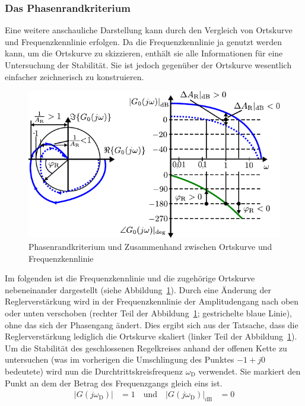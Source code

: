 \subsubsection{Das Phasenrandkriterium}
%
Eine weitere anschauliche Darstellung kann durch den Vergleich von Ortskurve und Frequenzkennlinie erfolgen. Da die Frequenzkennlinie ja genutzt werden kann, um die Ortskurve zu skizzieren, enthält sie alle Informationen für eine Untersuchung der Stabilität. Sie ist jedoch gegenüber der Ortskurve wesentlich einfacher zeichnerisch zu konstruieren. 
%
\begin{figure}[h!]
	\centering
	\includegraphics[width=.8\linewidth]{Abbildungen/Systemanalyse/PDF/Phasenrand.pdf}
	\caption{Phasenrandkriterium und Zusammenhand zwischen Ortskurve und Frequenzkennlinie}
	\label{fig:Phasenrand}
\end{figure}
%
Im folgenden ist die Frequenzkennlinie und die zugehörige Ortskurve nebeneinander dargestellt (siehe Abbildung~\ref{fig:Phasenrand}). Durch eine Änderung der Reglerverstärkung wird in der Frequenzkennlinie der Amplitudengang nach oben oder unten verschoben (rechter Teil der Abbildung~\ref{fig:Phasenrand}; gestrichelte blaue Linie), ohne das sich der Phasengang ändert. Dies ergibt sich aus der Tatsache, dass die Reglerverstärkung lediglich die Ortskurve skaliert (linker Teil der Abbildung~\ref{fig:Phasenrand}). Um die Stabilität des geschlossenen Regelkreises anhand der offenen Kette zu untersuchen (was im vorherigen die Umschlingung des Punktes $-1+j0$ bedeutete) wird nun die Durchtrittskreisfrequenz $\omega_{\text{D}}$ verwendet. Sie markiert den Punkt an dem der Betrag des Frequenzgangs gleich eins ist.
%
\begin{equation*}
\begin{aligned}
%
|G(j\omega_{\text{D}})|&=1 \quad \text{und} \quad |G(j\omega_{\text{D}})|_{\text{dB}}&=0
%
\end{aligned}
\end{equation*}
